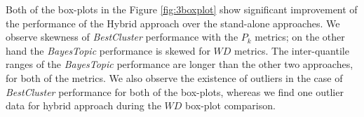 \documentclass{article}
\begin{document}
\begin{table}[h!]
\centering
{}
 \caption{Number of segments used for BayesTopic, BestCluster and Hybrid Approach for the Best Results (including the time for each of the meetings)}\label{tab:segres}%
\end{table}

Both of the box-plots in the Figure \ref{fig:3boxplot} show significant improvement of the performance of the Hybrid approach over the stand-alone approaches. We observe skewness of \emph{BestCluster} performance with the $P_k$ metrics; on the other hand the \emph{BayesTopic} performance is skewed for $WD$ metrics.  The inter-quantile ranges of the \emph{BayesTopic} performance are longer than the other two approaches, for both of the metrics. We also observe the existence of outliers in the case of \emph{BestCluster} performance for both of the box-plots, whereas we find one outlier data for hybrid approach during the $WD$ box-plot comparison.
\end{document}

